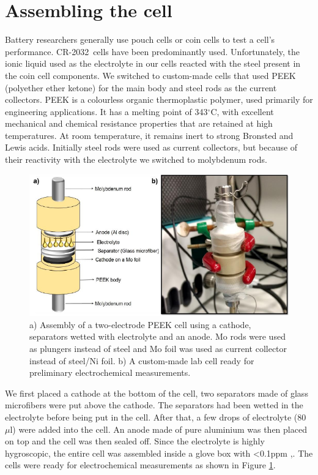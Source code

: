\section{Assembling the cell}
Battery researchers generally use pouch cells or coin cells to test a cell's performance. CR-2032\textregistered\ cells have been predominantly used. Unfortunately, the ionic liquid used as the electrolyte in our cells reacted with the steel present in the coin cell components. We switched to custom-made cells that used PEEK (polyether ether ketone) for the main body and steel rods as the current collectors. PEEK  is a colourless organic thermoplastic polymer, used primarily for engineering applications. It has a melting point of 343$^{\circ}$C,  with excellent mechanical and chemical resistance properties that are retained at high temperatures. At room temperature, it remains inert to strong Bronsted and Lewis acids. Initially steel rods were used as current collectors, but because of their reactivity with the electrolyte we switched to molybdenum rods. 
\begin{figure}[tbh!]
\centering
\includegraphics[width=\textwidth]{Figures/chap3fig/swagelok}
\caption{a) Assembly of a two-electrode PEEK cell using a cathode, separators wetted with electrolyte and an anode. Mo rods were used as plungers instead of steel and Mo foil was used as current collector instead of steel/Ni foil. b) A custom-made lab cell ready for preliminary electrochemical measurements.}
\label{Figures/chap3fig:swagelok}
\end{figure}
We first placed a cathode at the bottom of the cell, two separators made of glass microfibers were put above the cathode. The separators had been wetted in the electrolyte before being put in the cell. After that, a few drops of electrolyte (80 $\mu$l) were added into the cell. An anode made of pure aluminium was then placed on top and the cell was then sealed off. Since the electrolyte is highly hygroscopic, the entire cell was assembled inside a glove box with <0.1ppm ,.
The cells were ready for electrochemical measurements as shown in Figure \ref{Figures/chap3fig:swagelok}. 





















